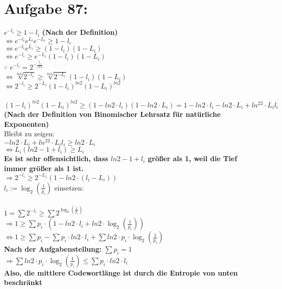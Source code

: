 \documentclass{article}
\begin{document}
\section{Aufgabe 87:}
$e^{-l_i}\geq1-l_i$ \textbf{(Nach der Definition)}\\
$\Leftrightarrow e^{-l_i}e^{L_i}e^{-L_i}\geq1-l_i$\\
$\Leftrightarrow e^{-l_i}e^{L_i}\geq(1-l_i)(1-L_i)$\\
$\Leftrightarrow e^{-l_i}\geq e^{-L_i}(1-l_i)(1-L_i)$\\
$\because$ $e^{-l_i}=2^{-\frac{l_i}{ln2}}$\\
$\Leftrightarrow \sqrt[ln2]{2^{-l_i}} \geq \sqrt[ln2]{2^{-L_i}}(1-l_i)(1-L_i)$\\
$\Leftrightarrow 2^{-l_i} \geq 2^{-L_i}(1-l_i)^{ln2}(1-L_i)^{ln2}$\\
\\
$(1-l_i)^{ln2}(1-L_i)^{ln2} \geq (1-ln2\cdot l_i)(1-{ln2}\cdot L_i) = 1 - ln2 \cdot l_i - ln2 \cdot L_i+ln^22\cdot L_il_i$\\ 
\textbf{(Nach der Definition von Binomischer Lehrsatz für natürliche Exponenten)}\\
Bleibt zu zeigen: \\
$-ln2\cdot L_i+ln^22 \cdot L_il_i \geq ln2 \cdot L_i$\\
$\Leftrightarrow L_i(ln2-1+l_i) \geq L_i$ \\
\textbf{Es ist sehr offensichtlich, dass $ln2-1+l_i$ größer als 1, weil die Tief immer größer als 1 ist.} \\
$\Rightarrow 2^{-l_i} \geq 2^{-L_1}(1-ln2 \cdot (l_i-L_i))$\\
$l_i := \log _2\left(\frac{1}{p_i}\right)$ einsetzen:\\
\\
$1=\sum 2^{-l_i} \geq \sum 2^{\log _2\left(\frac{1}{p_i}\right)}$\\
$\Rightarrow 1 \geq \sum p_i \cdot (1-ln2 \cdot l_i + ln2 \cdot \log _2\left(\frac{1}{p_i}\right))$\\
$\Leftrightarrow 1\geq \sum p_i - \sum p_i \cdot ln2\cdot l_i + \sum ln2 \cdot p_i \cdot \log _2\left(\frac{1}{p_i}\right)$\\
\textbf{Nach der Aufgabenstellung: }$\sum p_i = 1$\\
$\Rightarrow \sum ln2 \cdot p_i \cdot \log _2\left(\frac{1}{p_i}\right) \leq \sum p_i \cdot ln2\cdot l_i$\\
\textbf{Also, die mittlere Codewortlänge ist durch die Entropie von unten beschränkt}
\end{document}

